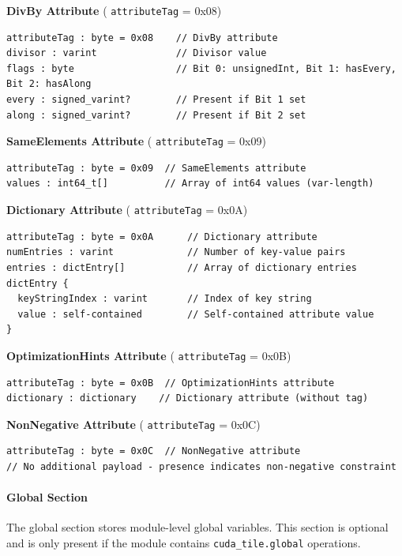 \documentclass{article}
\begin{document}
\textbf{DivBy Attribute} ( \texttt{attributeTag} = 0x08)


\begin{lstlisting}
attributeTag : byte = 0x08    // DivBy attribute
divisor : varint              // Divisor value
flags : byte                  // Bit 0: unsignedInt, Bit 1: hasEvery, Bit 2: hasAlong
every : signed_varint?        // Present if Bit 1 set
along : signed_varint?        // Present if Bit 2 set
\end{lstlisting}

\textbf{SameElements Attribute} ( \texttt{attributeTag} = 0x09)


\begin{lstlisting}
attributeTag : byte = 0x09  // SameElements attribute
values : int64_t[]          // Array of int64 values (var-length)
\end{lstlisting}

\textbf{Dictionary Attribute} ( \texttt{attributeTag} = 0x0A)


\begin{lstlisting}
attributeTag : byte = 0x0A      // Dictionary attribute
numEntries : varint             // Number of key-value pairs
entries : dictEntry[]           // Array of dictionary entries
dictEntry {
  keyStringIndex : varint       // Index of key string
  value : self-contained        // Self-contained attribute value
}
\end{lstlisting}

\textbf{OptimizationHints Attribute} ( \texttt{attributeTag} = 0x0B)


\begin{lstlisting}
attributeTag : byte = 0x0B  // OptimizationHints attribute
dictionary : dictionary    // Dictionary attribute (without tag)
\end{lstlisting}

\textbf{NonNegative Attribute} ( \texttt{attributeTag} = 0x0C)


\begin{lstlisting}
attributeTag : byte = 0x0C  // NonNegative attribute
// No additional payload - presence indicates non-negative constraint
\end{lstlisting}


\paragraph{Global Section}

The global section stores module-level global variables. This section is optional and is only present if the module contains \texttt{cuda\_tile.global} operations.
\end{document}
